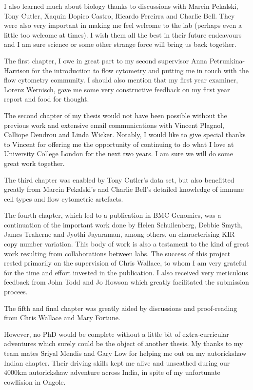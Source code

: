 \begin{acknowledgements}
 I also learned much about biology thanks to discussions with Marcin Pekalski, Tony Cutler, Xaquin Dopico Castro, Ricardo Fereirra and Charlie Bell.
 They were also very important in making me feel welcome to the lab (perhaps even a little too welcome at times).
 I wish them all the best in their future endeavours and I am sure science or some other strange force will bring us back together.

 The first chapter, I owe in great part to my second supervisor Anna Petrunkina-Harrison for the introduction to flow cytometry and putting me in touch with the flow cytometry community.
 I should also mention that my first year examiner, Lorenz Wernisch, gave me some very constructive feedback on my first year report and food for thought.

 The second chapter of my thesis would not have been possible without the previous work and extensive email communications with Vincent Plagnol, Calliope Dendrou and Linda Wicker.
 Notably, I would like to give special thanks to Vincent for offering me the opportunity of continuing to do what I love at University College London for the next two years.
 I am sure we will do some great work together.

 The third chapter was enabled by Tony Cutler's data set, but also benefitted greatly from Marcin Pekalski's and Charlie Bell's detailed knowledge of immune cell types and flow cytometric artefacts.

 The fourth chapter, which led to a publication in BMC Genomics, was a continuation of the important work done by Helen Schuilenberg, Debbie Smyth, James Traherne and Jyothi Jayaraman, among others, on characterising KIR copy number variation.
 This body of work is also a testament to the kind of great work resulting from collaborations between labs.
 The success of this project rested primarily on the supervision of Chris Wallace, to whom I am very grateful for the time and effort invested in the publication.
 I also received very meticulous feedback from John Todd and Jo Howson which greatly facilitated the submission procees.

 The fifth and final chapter was greatly aided by discussions and proof-reading from Chris Wallace and Mary Fortune.

 However, no PhD would be complete without a little bit of extra-curricular adventures which surely could be the object of another thesis.
 My thanks to my team mates Sriyal Mendis and Gary Low for helping me out on my autorickshaw Indian chapter.
 Their driving skills kept me alive and unscathed during our 4000km autorickshaw adventure across India, in spite of my unfortunate cowllision in Ongole.


\end{acknowledgements}
